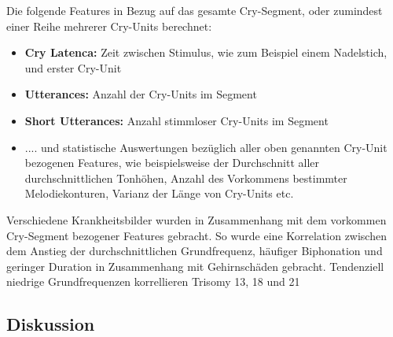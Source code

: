 Die folgende Features in Bezug auf das gesamte Cry-Segment, oder zumindest einer Reihe mehrerer Cry-Units berechnet:

\begin{itemize}
	\item \textbf{Cry Latenca: } Zeit zwischen Stimulus, wie zum Beispiel einem Nadelstich, und erster Cry-Unit
	\item \textbf{Utterances: } Anzahl der Cry-Units im Segment
	\item \textbf{Short Utterances: } Anzahl stimmloser Cry-Units im Segment
	\item .... und statistische Auswertungen bezüglich aller oben genannten Cry-Unit bezogenen Features, wie beispielsweise der Durchschnitt aller durchschnittlichen Tonhöhen, Anzahl des Vorkommens bestimmter Melodiekonturen, Varianz der Länge von Cry-Units etc.\cite[S. 85]{parentalPerception}
\end{itemize}

Verschiedene Krankheitsbilder wurden in Zusammenhang mit dem vorkommen Cry-Segment bezogener Features gebracht. So wurde eine Korrelation zwischen dem Anstieg der durchschnittlichen Grundfrequenz, häufiger Biphonation und geringer Duration in Zusammenhang mit Gehirnschäden gebracht. Tendenziell niedrige Grundfrequenzen korrellieren Trisomy 13, 18 und 21\cite[S. 85]{parentalPerception}

\subsection{Diskussion}
\label{sec:cryDiscussion}

